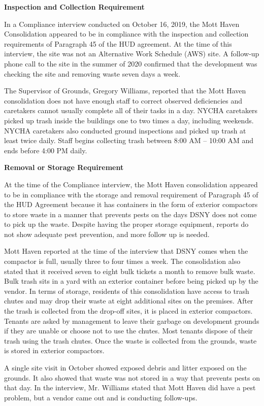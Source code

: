 
\textbf{Inspection and Collection Requirement}

In a Compliance interview conducted on October 16, 2019, the Mott Haven Consolidation appeared to be in compliance with the inspection and collection requirements of Paragraph 45 of the HUD agreement. At the time of this interview, the site was not an Alternative Work Schedule (AWS) site. A follow-up phone call to the site in the summer of 2020 confirmed that the development was checking the site and removing waste seven days a week.

The Supervisor of Grounds, Gregory Williams, reported that the Mott Haven consolidation does not have enough staff to correct observed deficiencies and caretakers cannot usually complete all of their tasks in a day. NYCHA caretakers picked up trash inside the buildings one to two times a day, including weekends. NYCHA caretakers also conducted ground inspections and picked up trash at least twice daily. Staff begins collecting trash between 8:00 AM -- 10:00 AM and ends before 4:00 PM daily.

\textbf{Removal or Storage Requirement}

At the time of the Compliance interview, the Mott Haven consolidation appeared to be in compliance with the storage and removal requirement of Paragraph 45 of the HUD Agreement because it has containers in the form of exterior compactors to store waste in a manner that prevents pests on the days DSNY does not come to pick up the waste. Despite having the proper storage equipment, reports do not show adequate pest prevention, and more follow up is needed.

Mott Haven reported at the time of the interview that DSNY comes when the compactor is full, usually three to four times a week. The consolidation also stated that it received seven to eight bulk tickets a month to remove bulk waste. Bulk trash sits in a yard with an exterior container before being picked up by the vendor. In terms of storage, residents of this consolidation have access to trash chutes and may drop their waste at eight additional sites on the premises. After the trash is collected from the drop-off sites, it is placed in exterior compactors. Tenants are asked by management to leave their garbage on development grounds if they are unable or choose not to use the chutes. Most tenants dispose of their trash using the trash chutes. Once the waste is collected from the grounds, waste is stored in exterior compactors.  

A single site visit in October showed exposed debris and litter exposed on the grounds. It also showed that waste was not stored in a way that prevents pests on that day. In the interview, Mr. Williams stated that Mott Haven did have a pest problem, but a vendor came out and is conducting follow-ups.

